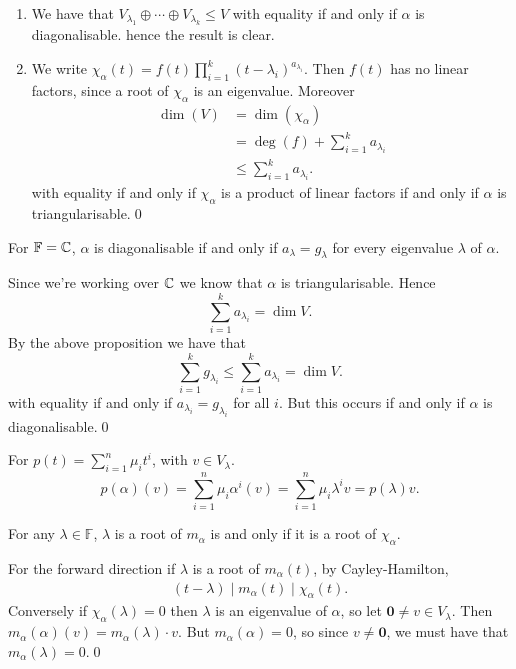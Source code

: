 \documentclass{article}
\newcommand{\F}{\mathbb{F}}
\begin{document}
\pf 
\begin{enumerate}
	\item We have that $ V_{\lambda_1}\oplus \cdots \oplus V_{\lambda_k}\le V $ with equality if and only if $ \alpha $ is diagonalisable. hence the result is clear.
	\item We write $ \chi_\alpha(t)=f(t) \prod_{i=1}^k(t-\lambda_i)^{a_{\lambda_i}} $. Then $ f(t) $ has no linear factors, since a root of $ \chi_\alpha $ is an eigenvalue. Moreover 
		\begin{align*}
			\dim(V)&=\dim(\chi_\alpha)\\
			       &=\deg(f)+\sum_{i=1}^ka_{\lambda_i}\\
			       &\le \sum_{i=1}^ka_{\lambda_i}.
		\end{align*}
		with equality if and only if $ \chi_\alpha $ is a product of linear factors if and only if $ \alpha $ is triangularisable.\qed
\end{enumerate}
\begin{proposition}
  For $ \F=\C $, $ \alpha $ is diagonalisable if and only if $ a_\lambda=g_\lambda $ for every eigenvalue $ \lambda $ of $ \alpha $.
\end{proposition}
\pf Since we're working over $ \mathbb{C} $ we know that $ \alpha $ is triangularisable. Hence
\[
	\sum_{i=1}^ka_{\lambda_i}=\dim V.
\]
By the above proposition we have that
\[
	\sum_{i=1}^k g_{\lambda_i}\le \sum_{i=1}^k a_{\lambda_i}=\dim V.
\]
with equality if and only if $ a_{\lambda_i}=g_{\lambda_i} $ for all $ i $. But this occurs if and only if $ \alpha $ is diagonalisable.\qed
\begin{remark}
	For $ p(t)=\sum_{i=1}^n\mu_it^i $, with $ v\in V_{\lambda} $.
	\[
		p(\alpha)(v)=\sum_{i=1}^n\mu_i\alpha^i(v)=\sum_{i=1}^n\mu_i\lambda^iv=p(\lambda)v.
	\]
\end{remark}
\begin{lemma}
  For any $ \lambda \in \F $, $ \lambda $ is a root of $ m_\alpha $ is and only if it is a root of $ \chi_\alpha $.
\end{lemma}
\pf For the forward direction if $ \lambda $ is a root of $ m_\alpha(t) $, by Cayley-Hamilton,
\begin{align*}
	(t-\lambda)\mid m_\alpha(t)\mid \chi_\alpha(t).
\end{align*}
Conversely if $ \chi_\alpha(\lambda)=0 $ then $ \lambda $ is an eigenvalue of $ \alpha $, so let $ \mathbf 0 \ne v\in V_\lambda $. Then $ m_\alpha(\alpha)(v)=m_\alpha(\lambda)\cdot v $. But $ m_\alpha(\alpha)=0 $, so since $ v\ne \mathbf 0 $, we must have that $ m_\alpha(\lambda)=0 $.\qed
\end{document}
